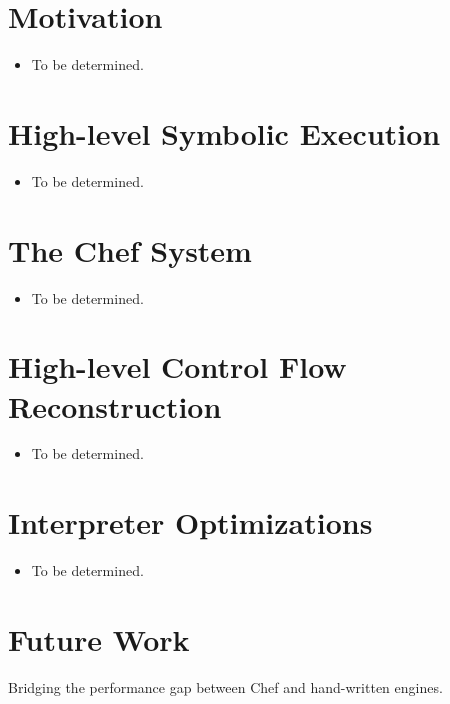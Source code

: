 \section{Motivation}

\begin{itemize}
  \item To be determined.
\end{itemize}

\section{High-level Symbolic Execution}

\begin{itemize}
  \item To be determined.
\end{itemize}

\section{The Chef System}

\begin{itemize}
  \item To be determined.
\end{itemize}

\section{High-level Control Flow Reconstruction}

\begin{itemize}
  \item To be determined.
\end{itemize}

\section{Interpreter Optimizations}

\begin{itemize}
  \item To be determined.
\end{itemize}

\section{Future Work}

Bridging the performance gap between Chef and hand-written engines.

